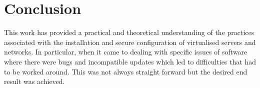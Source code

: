 \pagebreak
\section{Conclusion}
This work has provided a practical and theoretical understanding of the practices associated with the installation and secure configuration of virtualised servers and networks. In particular, when it came to dealing with specific issues of software where there were bugs and incompatible updates which led to difficulties that had to be worked around. This was not always straight forward but the desired end result was achieved.
